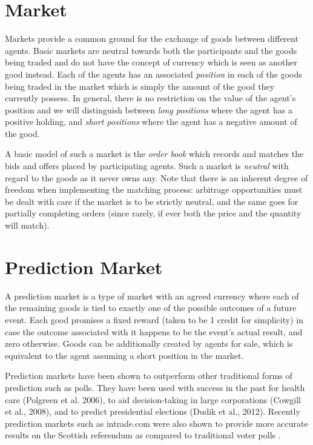 \documentclass[bsc,frontabs,twoside,singlespacing,parskip,deptreport]{infthesis}     %
\begin{document}
\section{Market}

    Markets provide a common ground for the exchange of goods between different agents. Basic markets are neutral towards both the participants and the goods being traded and do not have the concept of currency which is seen as another good instead. Each of the agents has an associated {\em position} in each of the goods being traded in the market which is simply the amount of the good they currently possess. In general, there is no restriction on the value of the agent's position and we will distinguish between {\em long positions} where the agent has a positive holding, and {\em short positions} where the agent has a negative amount of the good.

    A basic model of such a market is the {\em order book} which records and matches the bids and offers placed by participating agents. Such a market is {\em neutral} with regard to the goods as it never owns any. Note that there is an inherent degree of freedom when implementing the matching process: arbitrage opportunities must be dealt with care if the market is to be strictly neutral, and the same goes for partially completing orders (since rarely, if ever both the price and the quantity will match).


\section{Prediction Market}

    A prediction market is a type of market with an agreed currency where each of the remaining goods is tied to exactly one of the possible outcomes of a future event. Each good promises a fixed reward (taken to be 1 credit for simplicity) in case the outcome associated with it happens to be the event's actual result, and zero otherwise. Goods can be additionally created by agents for sale, which is equivalent to the agent assuming a short position in the market.
    
    Prediction markets have been shown to outperform other traditional forms of prediction such as polls. They have been used with success in the past for health care (Polgreen et al. 2006), to aid decision-taking in large corporations (Cowgill et al., 2008), and to predict presidential elections (Dudik et al., 2012). Recently prediction markets such as intrade.com were also shown to provide more accurate results on the Scottish referendum as compared to traditional voter polls \cite{bell_the_2014}.
\end{document}
